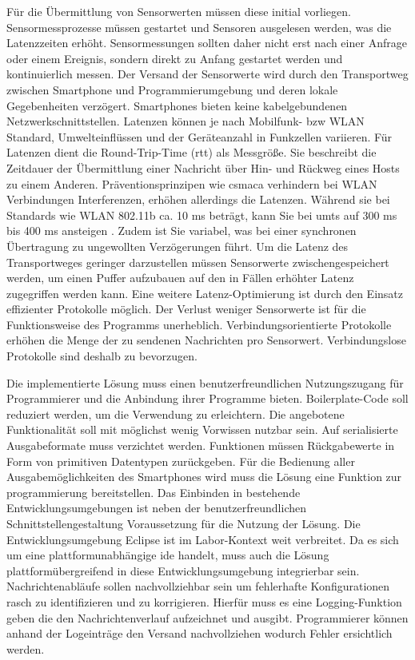 \documentclass[11pt,a4paper]{report}
\begin{document}
Für die Übermittlung von Sensorwerten müssen diese initial vorliegen.
Sensormessprozesse müssen gestartet und Sensoren ausgelesen werden, was die Latenzzeiten erhöht.
Sensormessungen sollten daher nicht erst nach einer Anfrage oder einem Ereignis, sondern direkt zu Anfang gestartet werden und kontinuierlich messen.
Der Versand der Sensorwerte wird durch den Transportweg zwischen Smartphone und Programmierumgebung und deren lokale Gegebenheiten verzögert.
Smartphones bieten keine kabelgebundenen Netzwerkschnittstellen.
Latenzen können je nach Mobilfunk- bzw WLAN Standard, Umwelteinflüssen und der Geräteanzahl in Funkzellen variieren.
Für Latenzen dient die Round-Trip-Time (\acrshort{rtt}) als Messgröße.
Sie beschreibt die Zeitdauer der Übermittlung einer Nachricht über Hin- und Rückweg eines Hosts zu einem Anderen.
Präventionsprinzipen wie \acrshort{csmaca} verhindern bei WLAN Verbindungen Interferenzen, erhöhen allerdings die Latenzen.
Während sie bei Standards wie WLAN 802.11b ca. 10 ms beträgt, kann Sie bei \acrshort{umts} auf 300 ms bis 400 ms ansteigen \cite{network_latencies} .
Zudem ist Sie variabel, was bei einer synchronen Übertragung zu ungewollten Verzögerungen führt.
Um die Latenz des Transportweges geringer darzustellen müssen Sensorwerte zwischengespeichert werden, um einen Puffer aufzubauen auf den in Fällen erhöhter Latenz zugegriffen werden kann.
Eine weitere Latenz-Optimierung ist durch den Einsatz effizienter Protokolle möglich.
Der Verlust weniger Sensorwerte ist für die Funktionsweise des Programms unerheblich.
Verbindungsorientierte Protokolle erhöhen die Menge der zu sendenen Nachrichten pro Sensorwert.
Verbindungslose Protokolle sind deshalb zu bevorzugen.

Die implementierte Lösung muss einen benutzerfreundlichen Nutzungszugang  für Programmierer und die Anbindung ihrer Programme bieten.
Boilerplate-Code soll reduziert werden, um die Verwendung zu erleichtern.
Die angebotene Funktionalität soll mit möglichst wenig Vorwissen nutzbar sein.
Auf serialisierte Ausgabeformate muss verzichtet werden.
Funktionen müssen Rückgabewerte in Form von primitiven Datentypen zurückgeben.
Für die Bedienung aller Ausgabemöglichkeiten des Smartphones wird muss die Lösung eine Funktion zur programmierung bereitstellen.
Das Einbinden in bestehende Entwicklungsumgebungen ist neben der benutzerfreundlichen Schnittstellengestaltung Voraussetzung für die Nutzung der Lösung.
Die Entwicklungsumgebung Eclipse ist im Labor-Kontext weit verbreitet.
Da es sich um eine plattformunabhängige \acrshort{ide} handelt, muss auch die Lösung plattformübergreifend in diese Entwicklungsumgebung integrierbar sein.
Nachrichtenabläufe sollen nachvollziehbar sein um fehlerhafte Konfigurationen rasch zu identifizieren und zu korrigieren.
Hierfür muss es eine Logging-Funktion geben die den Nachrichtenverlauf aufzeichnet und ausgibt.
Programmierer können anhand der Logeinträge den Versand nachvollziehen wodurch Fehler ersichtlich werden.
\end{document}
